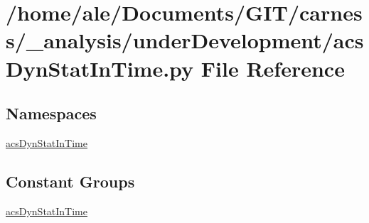 \hypertarget{a00036}{\section{/home/ale/\-Documents/\-G\-I\-T/carness/\-\_\-analysis/under\-Development/acs\-Dyn\-Stat\-In\-Time.py File Reference}
\label{a00036}
}
\subsection*{Namespaces}
\begin{DoxyCompactItemize}
\item 
\hyperlink{a00093}{acs\-Dyn\-Stat\-In\-Time}
\end{DoxyCompactItemize}
\subsection*{Constant Groups}
\begin{DoxyCompactItemize}
\item 
\hyperlink{a00093}{acs\-Dyn\-Stat\-In\-Time}
\end{DoxyCompactItemize}
